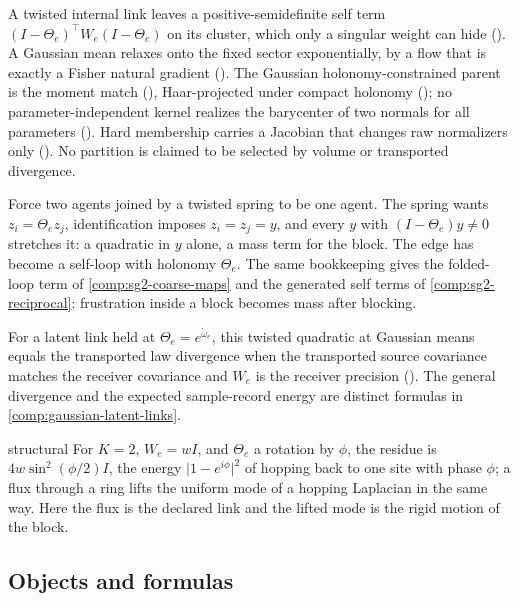 A twisted internal link leaves a positive-semidefinite self term \((I-\Theta_e)^\top W_e(I-\Theta_e)\) on its
cluster, which only a singular weight can hide (). A Gaussian mean relaxes onto the
fixed sector exponentially, by a flow that is exactly a Fisher natural gradient ().
The Gaussian holonomy-constrained parent is the moment match (),
Haar-projected under compact holonomy (); no parameter-independent kernel
realizes the barycenter of two normals for all parameters (). Hard
membership carries a Jacobian that changes raw normalizers only (). No partition is
claimed to be selected by volume or transported divergence.

Force two agents joined by a twisted spring to be one agent. The spring wants \(z_i=\Theta_ez_j\), identification
imposes \(z_i=z_j=y\), and every \(y\) with \((I-\Theta_e)y\neq0\) stretches it: a quadratic in \(y\) alone, a mass term
for the block. The edge has become a self-loop with holonomy \(\Theta_e\). The same bookkeeping gives the folded-loop
term of \cref{comp:sg2-coarse-maps} and the generated self terms of \cref{comp:sg2-reciprocal}: frustration inside a
block becomes mass after blocking.

For a latent link held at \(\Theta_e=e^{\mathring\omega_e}\), this twisted quadratic at Gaussian
means equals the transported law divergence when the transported source covariance matches
the receiver covariance and \(W_e\) is the receiver precision ().
The general divergence and the expected sample-record energy are distinct formulas in
\cref{comp:gaussian-latent-links}.

\begin{analogy}{structural}
For \(K=2\), \(W_e=wI\), and \(\Theta_e\) a rotation by \(\phi\), the residue is \(4w\sin^2(\phi/2)I\), the energy
\(\lvert1-e^{i\phi}\rvert^2\) of hopping back to one site with phase \(\phi\); a flux through a ring lifts the uniform
mode of a hopping Laplacian in the same way. Here the flux is the declared link and the lifted mode is the rigid
motion of the block.
\end{analogy}

\subsection{Objects and formulas}

